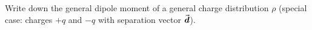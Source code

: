 

\vspace*{\fill}
\centering

Write down the general dipole moment of a general charge distribution $\rho$ (special case: charges $+q$ and $-q$ with separation vector $\va*{d}$).

\centering
\vspace*{\fill}

